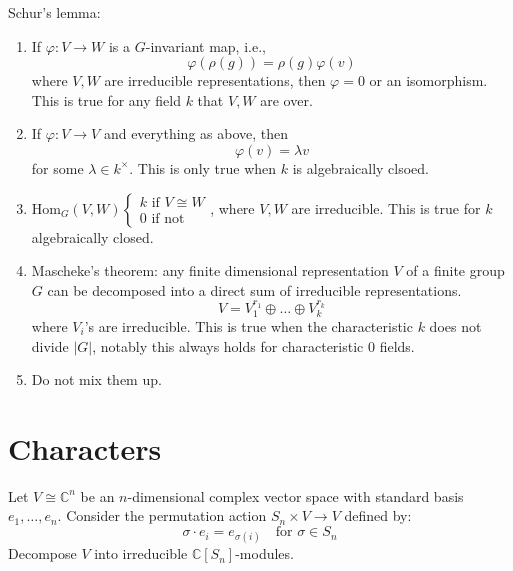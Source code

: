 \begin{thm}
    Schur's lemma: 
    \begin{enumerate}
        \item If $\varphi: V\to W$ is a $G$-invariant map, i.e., 
        \begin{equation*}
            \varphi(\rho(g))=\rho(g)\varphi(v)
        \end{equation*} 
        where $V,W$ are irreducible representations, then $\varphi=0$ or an isomorphism. This is true for any field $k$ that $V,W$ are over.
        \item If $\varphi: V\to V$ and everything as above, then 
        \begin{equation*}
            \varphi(v)=\lambda v
        \end{equation*}
        for some $\lambda\in k^\times$. This is only true when $k$ is algebraically clsoed.
        \item $\text{Hom}_G(V,W)\begin{cases}
            k \text{ if } V\cong W\\
            0 \text{ if  not}
        \end{cases}$, where $V,W$ are irreducible. This is true for $k$ algebraically closed.
        \item Mascheke's theorem: any finite dimensional representation $V$ of a finite group $G$ can be decomposed into a direct sum of irreducible representations.
        \begin{equation*}
            V=V_1^{r_1}\oplus\dots\oplus V_k^{r_k}
        \end{equation*}
        where $V_i$'s are irreducible. This is true when the characteristic $k$ does not divide $|G|$, notably this always holds for characteristic $0$ fields.
        \item Do not mix them up.
    \end{enumerate}
\end{thm}

\section{Characters}

\begin{prob}[S2008-Q4]
    Let \( V \cong \mathbb{C}^n \) be an \( n \)-dimensional complex vector space with standard basis \( e_1, \ldots, e_n \). Consider the permutation action \( S_n \times V \to V \) defined by:
    \[
    \sigma \cdot e_i = e_{\sigma(i)} \quad \text{for } \sigma \in S_n
    \]
    Decompose \( V \) into irreducible \( \mathbb{C}[S_n] \)-modules.
\end{prob}

